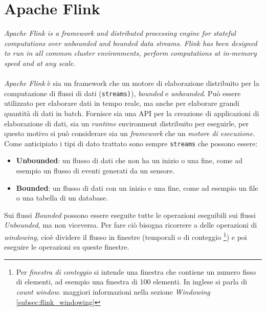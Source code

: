 \section{Apache Flink}
\label{sec:flink_overview}
\textit{Apache Flink is a framework and distributed processing engine for stateful computations over unbounded and bounded data streams. Flink has been designed to run in all common cluster environments, perform computations at in-memory speed and at any scale.}\cite*{flinkwebsite}\\\\
\textit{Apache Flink} è sia un framework che un motore di elaborazione distribuito per la computazione di flussi di dati (\texttt{streams)}), \textit{bounded} e \textit{unbounded}.
Può essere utilizzato per elaborare dati in tempo reale, ma anche per elaborare grandi quantità di dati in batch.
Fornisce sia una API per la creazione di applicazioni di elaborazione di dati, sia un \textit{runtime} environment distribuito per eseguirle,
per questo motivo si può considerare sia un \textit{framework} che un \textit{motore di esecuzione}.
Come anticipiato i tipi di dato trattato sono sempre \texttt{streams} che possono essere:
\begin{itemize}
    \item \textbf{Unbounded}: un flusso di dati che non ha un inizio o una fine, come ad esempio un flusso di eventi generati da un sensore.
    \item \textbf{Bounded}: un flusso di dati con un inizio e una fine, come ad esempio un file o una tabella di un database.
\end{itemize}
Sui flussi \textit{Bounded} possono essere eseguite tutte le operazioni eseguibili sui flussi \textit{Unbounded}, ma non viceversa.
Per fare ciò bisogna ricorrere a delle operazioni di \textit{windowing}, cioè dividere il flusso in finestre (temporali o di conteggio 
\footnote{Per \textit{finestra di conteggio} si intende una finestra che contiene un numero fisso di elementi, ad esempio una finestra di 100 elementi.
In inglese si parla di \textit{count window}. maggiori informazioni nella sezione \textit{Windowing} \ref{subsec:flink_windowing}})
e poi eseguire le operazioni su queste finestre.

